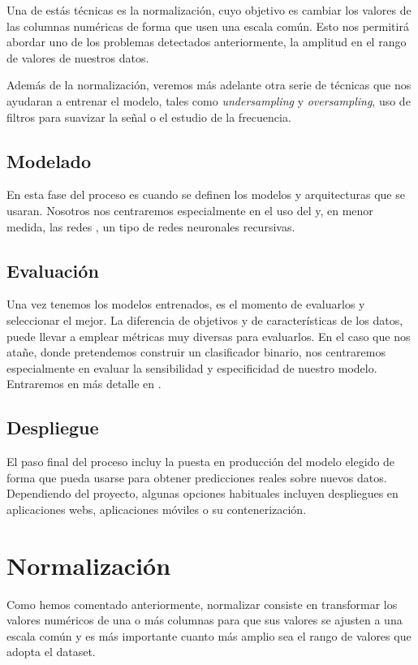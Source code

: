 Una de estás técnicas es la normalización, cuyo objetivo es cambiar los valores de las columnas numéricas de forma que usen una escala común. Esto nos permitirá abordar uno de los problemas detectados anteriormente, la amplitud en el rango de valores de nuestros datos.

Además de la normalización, veremos más adelante otra serie de técnicas que nos ayudaran a entrenar el modelo, tales como \textit{undersampling} y \textit{oversampling}, uso de filtros para suavizar la señal o el estudio de la frecuencia.

\subsection{Modelado}

En esta fase del proceso es cuando se definen los modelos y arquitecturas que se usaran. Nosotros nos centraremos especialmente en el uso del  y, en menor medida, las redes , un tipo de redes neuronales recursivas. 

\subsection{Evaluación}

Una vez tenemos los modelos entrenados, es el momento de evaluarlos y seleccionar el mejor. La diferencia de objetivos y de características de los datos, puede llevar a emplear métricas muy diversas para evaluarlos. En el caso que nos atañe, donde pretendemos construir un clasificador binario, nos centraremos especialmente en evaluar la sensibilidad y especificidad de nuestro modelo. Entraremos en más detalle en .

\subsection{Despliegue}

El paso final del proceso incluy la puesta en producción del modelo elegido de forma que pueda usarse para obtener predicciones reales sobre nuevos datos. Dependiendo del proyecto, algunas opciones habituales incluyen despliegues en aplicaciones webs, aplicaciones móviles o su contenerización.

\section{Normalización}
Como hemos comentado anteriormente, normalizar consiste en transformar los valores numéricos de una o más columnas para que sus valores se ajusten a una escala común y es más importante cuanto más amplio sea el rango de valores que adopta el dataset.  

